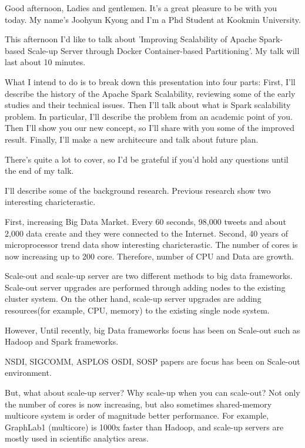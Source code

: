 Good afternoon, Ladies and gentlemen.
It's a great pleasure to be with you today.
My name's Joohyun Kyong and I'm a Phd Student at Kookmin University.

This afternoon I'd like to talk about 'Improving Scalability of Apache
Spark-based Scale-up Server through Docker Container-based Partitioning'.
My talk will last about 10 minutes.

What I intend to do is to break down this presentation into four parts:
First, I'll describe the history of the Apache Spark Scalability, reviewing some
of the early studies and their technical issues.
Then I'll talk about what is Spark scalability problem.
In particular, I'll describe the problem from an academic point of you.
Then I'll show you our new concept, 
so I'll share with you some of the improved result.
Finally, I'll make a new architecure and talk about future plan.

There's quite a lot to cover, so I'd be grateful if you'd hold any questions
until the end of my talk.

I'll describe some of the background research.
Previous research show two interesting charicterastic.

First, increasing Big Data Market. 
Every 60 seconds,  98,000 tweets 
and about 2,000 data create and they were connected to the Internet.
Second, 40 years of microprocessor trend data show interesting charicterastic.
The number of cores is now increasing up to 200 core.
Therefore, number of CPU and Data are growth.

Scale-out and scale-up server are two different methods to big data frameworks.
Scale-out server upgrades are performed through adding nodes to the existing
cluster system.
On the other hand, scale-up server upgrades are adding resources(for example,
CPU, memory) to the existing single node system.

However, Until recently, big Data frameworks focus has been on Scale-out such
as Hadoop and Spark frameworks.

NSDI, SIGCOMM, ASPLOS OSDI, SOSP papers are focus has been on Scale-out environment.


But, what about scale-up server? 
Why scale-up when you can scale-out?
Not only the number of cores is now increasing, but also sometimes
shared-memory multicore system is order of magnitude better performance.
For example, GraphLab1 (multicore) is 1000x faster than Hadoop, and scale-up
servers are mostly used in scientific analytics areas.

